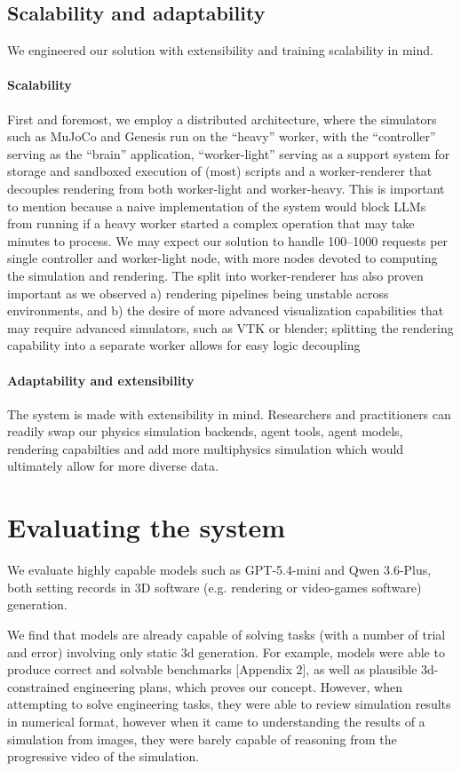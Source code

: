 \documentclass[conference]{IEEEtran}
\begin{document}
\subsection{Scalability and adaptability}
We engineered our solution with extensibility and training scalability in mind.

\paragraph{Scalability}
First and foremost, we employ a distributed architecture, where the simulators such as MuJoCo and Genesis run on the ``heavy'' worker, with the ``controller'' serving as the ``brain'' application, ``worker-light'' serving as a support system for storage and sandboxed execution of (most) scripts and a worker-renderer that decouples rendering from both worker-light and worker-heavy. This is important to mention because a naive implementation of the system would block LLMs from running if a heavy worker started a complex operation that may take minutes to process. We may expect our solution to handle 100--1000 requests per single controller and worker-light node, with more nodes devoted to computing the simulation and rendering.
The split into worker-renderer has also proven important as we observed a) rendering pipelines being unstable across environments, and b) the desire of more advanced visualization capabilities that may require advanced simulators, such as VTK or blender; splitting the rendering capability into a separate worker allows for easy logic decoupling

\paragraph{Adaptability and extensibility}
The system is made with extensibility in mind. Researchers and practitioners can readily swap our physics simulation backends, agent tools, agent models, rendering capabilties and add more multiphysics simulation which would ultimately allow for more diverse data.

\section{Evaluating the system}

We evaluate highly capable models such as GPT-5.4-mini and Qwen 3.6-Plus, both setting records in 3D software (e.g. rendering or video-games software) generation.

We find that models are already capable of solving tasks (with a number of trial and error) involving only static 3d generation. For example, models were able to produce correct and solvable benchmarks [Appendix 2], as well as plausible 3d-constrained engineering plans, which proves our concept. However, when attempting to solve engineering tasks, they were able to review simulation results in numerical format, however when it came to understanding the results of a simulation from images, they were barely capable of reasoning from the progressive video of the simulation.
\end{document}
